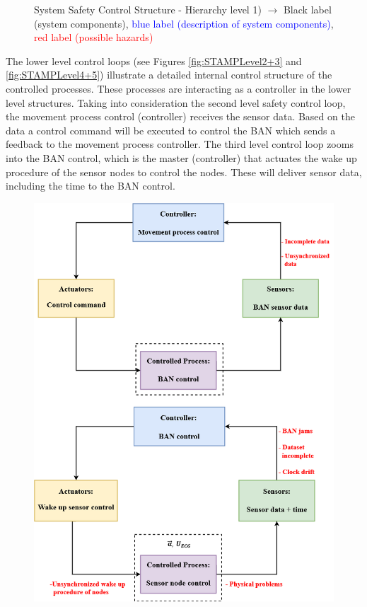 \documentclass[review]{elsarticle}
\begin{document}
\begin{itemize}
\begin{figure}[!ht]
		\caption[System Safety Control Structure]{System Safety Control Structure - Hierarchy level 1) $\rightarrow$ Black label (system components), \textcolor{blue}{blue label (description of system components)}, \textcolor{red}{red label (possible hazards)}}
		\label{fig:STAMPLevel1}
	\end{figure}

	The lower level control loops (see Figures \ref{fig:STAMPLevel2+3} and \ref{fig:STAMPLevel4+5}) illustrate a detailed internal control structure of the controlled processes. These processes are interacting as a controller in the lower level structures. Taking into consideration the second level safety control loop, the movement process control (controller) receives the sensor data. Based on the data a control command will be executed to control the BAN which sends a feedback to the movement process controller. The third level control loop zooms into the BAN control, which is the master (controller) that actuates the wake up procedure of the sensor nodes to control the nodes. These will deliver sensor data, including the time to the BAN control.
	\begin{figure}[!ht]
		\centering
		\includegraphics[scale=0.54]{Images/STAMP2+3level(3)}

\end{figure}
\end{itemize}
\end{document}
